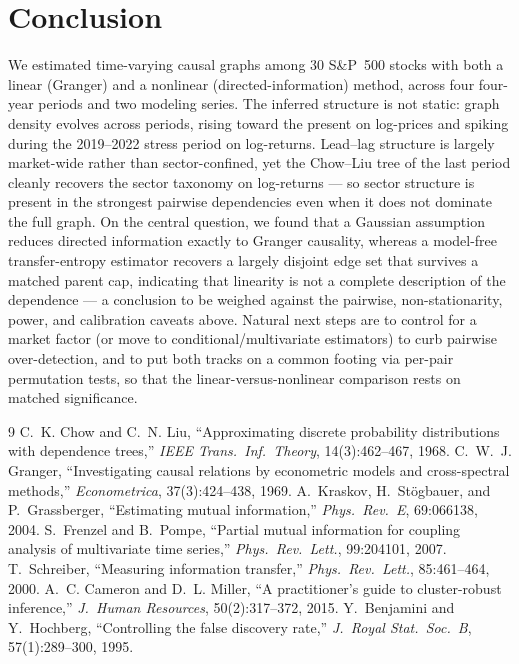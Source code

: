\documentclass[11pt,a4paper]{article}
\begin{document}
\section{Conclusion}
We estimated time-varying causal graphs among 30 S\&P~500 stocks with both a
linear (Granger) and a nonlinear (directed-information) method, across four
four-year periods and two modeling series. The inferred structure is not static:
graph density evolves across periods, rising toward the present on log-prices and
spiking during the 2019--2022 stress period on log-returns. Lead--lag structure is
largely market-wide rather than sector-confined, yet the Chow--Liu tree of the last
period cleanly recovers the sector taxonomy on log-returns --- so sector structure
is present in the strongest pairwise dependencies even when it does not dominate
the full graph. On the central question, we found that a Gaussian assumption
reduces directed information exactly to Granger causality, whereas a model-free
transfer-entropy estimator recovers a largely disjoint edge set that survives a
matched parent cap, indicating that linearity is not a complete description of the
dependence --- a conclusion to be weighed against the pairwise, non-stationarity,
power, and calibration caveats above. Natural next steps are to control for a
market factor (or move to conditional/multivariate estimators) to curb pairwise
over-detection, and to put both tracks on a common footing via per-pair
permutation tests, so that the linear-versus-nonlinear comparison rests on matched
significance.

\begin{thebibliography}{9}
 C.~K. Chow and C.~N. Liu,
  ``Approximating discrete probability distributions with dependence trees,''
  \emph{IEEE Trans.\ Inf.\ Theory}, 14(3):462--467, 1968.
 C.~W.~J. Granger,
  ``Investigating causal relations by econometric models and cross-spectral
  methods,'' \emph{Econometrica}, 37(3):424--438, 1969.
 A.~Kraskov, H.~St\"ogbauer, and P.~Grassberger,
  ``Estimating mutual information,'' \emph{Phys.\ Rev.\ E}, 69:066138, 2004.
 S.~Frenzel and B.~Pompe,
  ``Partial mutual information for coupling analysis of multivariate time
  series,'' \emph{Phys.\ Rev.\ Lett.}, 99:204101, 2007.
 T.~Schreiber,
  ``Measuring information transfer,'' \emph{Phys.\ Rev.\ Lett.}, 85:461--464, 2000.
 A.~C. Cameron and D.~L. Miller,
  ``A practitioner's guide to cluster-robust inference,''
  \emph{J.\ Human Resources}, 50(2):317--372, 2015.
 Y.~Benjamini and Y.~Hochberg,
  ``Controlling the false discovery rate,''
  \emph{J.\ Royal Stat.\ Soc.\ B}, 57(1):289--300, 1995.
\end{thebibliography}
\end{document}
